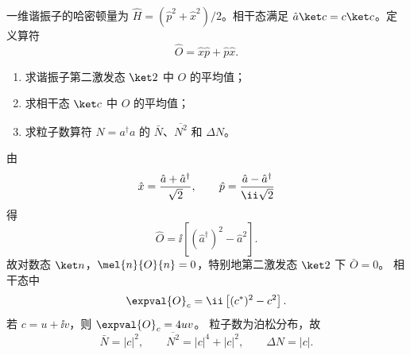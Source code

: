 \begin{question}
一维谐振子的哈密顿量为 $\hat H=(\hat p^2+\hat x^2)/2$。相干态满足 $\hat a\ket c=c\ket c$。定义算符
\[
  \hat O=\hat x\hat p+\hat p\hat x.
\]
\begin{enumerate}
  \item 求谐振子第二激发态 $\ket2$ 中 $O$ 的平均值；
  \item 求相干态 $\ket c$ 中 $O$ 的平均值；
  \item 求粒子数算符 $N=a^\dagger a$ 的 $\bar N$、$\overline{N^2}$ 和 $\Delta N$。
\end{enumerate}
\begin{solution}
由
\[
  \hat x={\hat a+\hat a^\dagger\over \sqrt2},\qquad
  \hat p={\hat a-\hat a^\dagger\over \ii\sqrt2}
\]
得
\[
  \hat O=\ii\left[(\hat a^\dagger)^2-\hat a^2\right].
\]
故对数态 $\ket n$，$\mel{n}{O}{n}=0$，特别地第二激发态 $\ket2$ 下 $\bar O=0$。
相干态中
\[
  \expval{O}_c=\ii\left[(c^*)^2-c^2\right].
\]
若 $c=u+\ii v$，则 $\expval{O}_c=4uv$。
粒子数为泊松分布，故
\[
  \bar N=|c|^2,
  \qquad \overline{N^2}=|c|^4+|c|^2,
  \qquad \Delta N=|c|.
\]
\end{solution}
\end{question}
